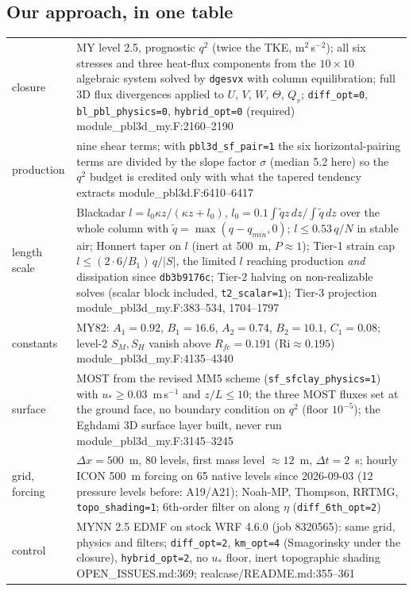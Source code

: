 \documentclass[10pt,a4paper]{article}
\newcommand{\dx}{\Delta x}
\newcommand{\qsq}{q^2}
\newcommand{\Ri}{\mathrm{Ri}}
\newcommand{\src}[1]{{\scriptsize\textcolor{black!60}{#1}}}
\begin{document}
\subsection*{Our approach, in one table}
\begin{small}
\begin{tabular}{@{}p{3.6cm}p{12.9cm}@{}}
\toprule
closure & MY level 2.5, prognostic $\qsq$ (twice the TKE, m$^2$\,s$^{-2}$); all six stresses and three heat-flux components from the $10\times10$ algebraic system solved by \texttt{dgesvx} with column equilibration; full 3D flux divergences applied to $U$, $V$, $W$, $\Theta$, $Q_v$; \texttt{diff\_opt=0}, \texttt{bl\_pbl\_physics=0}, \texttt{hybrid\_opt=0} (required) \src{module\_pbl3d\_my.F:2160--2190} \\
production & nine shear terms; with \texttt{pbl3d\_sf\_pair=1} the six horizontal-pairing terms are divided by the slope factor $\sigma$ (median 5.2 here) so the $\qsq$ budget is credited only with what the tapered tendency extracts \src{module\_pbl3d.F:6410--6417} \\
length scale & Blackadar $l = l_0\kappa z/(\kappa z + l_0)$, $l_0 = 0.1\int\tilde q z\,dz/\int\tilde q\,dz$ over the whole column with $\tilde q = \max(q - q_{min}, 0)$; $l \le 0.53\,q/N$ in stable air; Honnert taper on $l$ (inert at 500~m, $P \approx 1$); Tier-1 strain cap $l \le (2\cdot 6/B_1)\,q/|S|$, the limited $l$ reaching production \emph{and} dissipation since \texttt{db3b9176c}; Tier-2 halving on non-realizable solves (scalar block included, \texttt{t2\_scalar=1}); Tier-3 projection \src{module\_pbl3d\_my.F:383--534, 1704--1797} \\
constants & MY82: $A_1 = 0.92$, $B_1 = 16.6$, $A_2 = 0.74$, $B_2 = 10.1$, $C_1 = 0.08$; level-2 $S_M, S_H$ vanish above $R_{fc} = 0.191$ ($\Ri \approx 0.195$) \src{module\_pbl3d\_my.F:4135--4340} \\
surface & MOST from the revised MM5 scheme (\texttt{sf\_sfclay\_physics=1}) with $u_* \ge 0.03$~m\,s$^{-1}$ and $z/L \le 10$; the three MOST fluxes set at the ground face, no boundary condition on $\qsq$ (floor $10^{-5}$); the Eghdami 3D surface layer built, never run \src{module\_pbl3d\_my.F:3145--3245} \\
grid, forcing & $\dx = 500$~m, 80 levels, first mass level $\approx 12$~m, $\Delta t = 2$~s; hourly ICON 500~m forcing on 65 native levels since 2026-09-03 (12 pressure levels before: A19/A21); Noah-MP, Thompson, RRTMG, \texttt{topo\_shading=1}; 6th-order filter on along $\eta$ (\texttt{diff\_6th\_opt=2}) \\
control & MYNN 2.5 EDMF on stock WRF 4.6.0 (job 8320565): same grid, physics and filters; \texttt{diff\_opt=2}, \texttt{km\_opt=4} (Smagorinsky under the closure), \texttt{hybrid\_opt=2}, no $u_*$ floor, inert topographic shading \src{OPEN\_ISSUES.md:369; realcase/README.md:355--361} \\
\bottomrule
\end{tabular}
\end{small}
\end{document}
